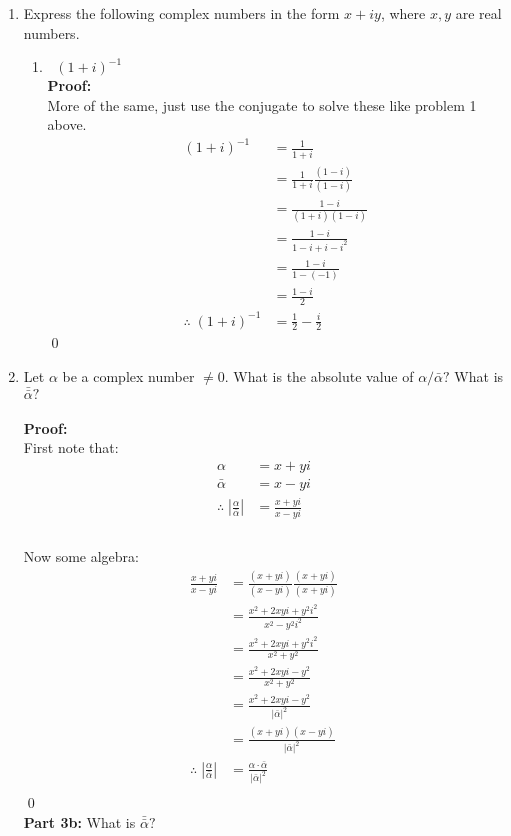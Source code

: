 \begin{enumerate}
	\item Express the following complex numbers in the form $x + iy$, where $x, y$ are real numbers.
	\begin{enumerate}
		\item $\;\;(1 + i)^{-1}$ \\
		
		\textbf{Proof:} \\
		More of the same, just use the conjugate to solve these like problem 1 above.
		\begin{align*}
		(1 + i)^{-1} &= \frac{1}{1 + i} \\
		&= \frac{1}{1 + i} \frac{(1 - i)}{(1 - i)} \\
		&= \frac{1 - i}{(1 + i)(1 - i)} \\
		&= \frac{1 - i}{1 - i + i - i^2} \\
		&= \frac{1 - i}{1 - (-1)} \\
		&= \frac{1 - i}{2} \\
		\therefore \; (1 + i)^{-1} &= \frac{1}{2} - \frac{i}{2}
		\end{align*}
		\qed
	\end{enumerate}
	
	\item Let $\alpha$ be a complex number $\neq 0.$ What is the absolute value of $\alpha/\bar{\alpha}?$ What is $\bar{\bar{\alpha}}?$ \\
	\\
	\textbf{Proof:} \\
	First note that: 
	\begin{align*}
	\alpha &= x + yi \\
	\bar{\alpha} &= x - yi \\
	\therefore \; \left| \frac{\alpha}{\bar{\alpha}} \right| &= \frac{x + yi}{x - yi} \\
	\end{align*}
	\\
	Now some algebra:
	\begin{align*}
	\frac{x + yi}{x - yi} &= \frac{(x + yi)}{(x - yi)} \frac{(x + yi)}{(x + yi)} \\
	&= \frac{x^2 + 2xyi +y^2 i^2}{x^2 - y^2 i^2} \\
	&= \frac{x^2 + 2xyi +y^2 i^2}{x^2 + y^2} \\
	&= \frac{x^2 + 2xyi - y^2}{x^2 + y^2 } \\
	&= \frac{x^2 + 2xyi - y^2}{ \left | \bar{\alpha} \right |^2  } \\
	&= \frac{(x + yi)(x - yi)}{ \left | \bar{\alpha} \right |^2  } \\
	\therefore \; \left| \frac{\alpha}{\bar{\alpha}} \right|  &= \frac{\alpha \cdot \bar{\alpha}}{ \left | \bar{\alpha} \right |^2  } \\
	\end{align*}
	\qed
	\\
	\subitem \textbf{Part 3b:} What is $\bar{\bar{\alpha}}?$ \\
	

\end{enumerate}
